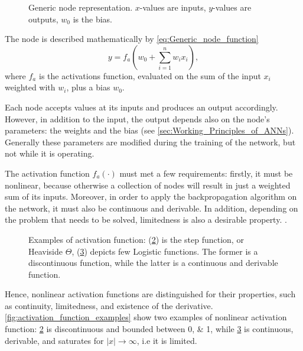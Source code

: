 \begin{figure}[ht]
	\centering
	
	\caption{Generic node representation. $x$-values are inputs, $y$-values are outputs, $w_0$ is the bias.}
	\label{fig:generic_node}
\end{figure}
The node is described mathematically by \cref{eq:Generic_node_function}
\begin{equation}
y = f_a \left(  w_0 + \sum_{i=1}^{n} w_i x_i \right),
\label{eq:Generic_node_function}
\end{equation}
where $f_a$ is the activations function, evaluated on the sum of the input $x_i$ weighted with $w_i$, plus a bias $w_0$.

\newpage
Each node accepts values at its inputs and produces an output accordingly.
However, in addition to the input, the output depends also on the node's parameters: the weights and the bias (see \autoref{sec:Working_Principles_of_ANNs}).
Generally these parameters are modified during the training of the network, but not while it is operating.

The activation function $f_a\left(\cdot\right)$ must met a few requirements: firstly, it must be nonlinear, because otherwise a collection of nodes will result in just a weighted sum of its inputs.
Moreover, in order to apply the backpropagation algorithm on the network, it must also be continuous and derivable.
In addition, depending on the problem that needs to be solved, limitedness is also a desirable property. \cite{duda2012pattern}.

\begin{figure}[ht]
	\begin{subfigure}[b]{0.49\textwidth}
		\centering
		
		\caption{}
		\label{fig:activation_function_example_1}
  \end{subfigure}
  \begin{subfigure}[b]{0.49\textwidth}
  		\centering
		
		\caption{}
		\label{fig:activation_function_example_2}
  \end{subfigure}
  \caption{
		Examples of activation function:
		(\ref{fig:activation_function_example_1}) is the step function,
		or Heaviside $\Theta$,
		(\ref{fig:activation_function_example_2}) depicts few Logistic functions.
		The former is a discontinuous function, while the latter is a continuous and derivable function.}
  	\label{fig:activation_function_examples}
\end{figure}

Hence, nonlinear activation functions are distinguished for their properties, such as continuity, limitedness, and existence of the derivative.
\autoref{fig:activation_function_examples} show two examples of nonlinear activation function: \ref{fig:activation_function_example_1} is discontinuous and bounded between \numlist{0;1}, while \ref{fig:activation_function_example_2} is continuous, derivable, and saturates for $|x|\rightarrow\infty$, i.e it is limited.

